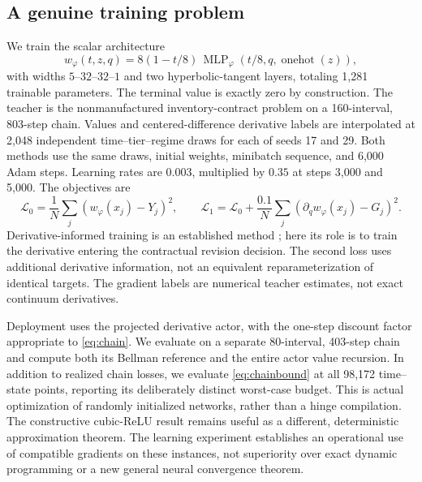\subsection{A genuine training problem}
We train the scalar architecture
\[
 w_\varphi(t,z,q)=8(1-t/8)\,
 \operatorname{MLP}_\varphi(t/8,q,\operatorname{onehot}(z)),
\]
with widths $5$--$32$--$32$--$1$ and two hyperbolic-tangent layers, totaling 1,281 trainable parameters. The terminal value is exactly zero by construction. The teacher is the nonmanufactured inventory-contract problem on a 160-interval, 803-step chain. Values and centered-difference derivative labels are interpolated at 2,048 independent time--tier--regime draws for each of seeds 17 and 29. Both methods use the same draws, initial weights, minibatch sequence, and 6,000 Adam steps. Learning rates are $0.003$, multiplied by $0.35$ at steps 3,000 and 5,000. The objectives are
\[
 \mathcal L_0=\frac1N\sum_j(w_\varphi(x_j)-Y_j)^2,
 \qquad
 \mathcal L_1=\mathcal L_0+
 \frac{0.1}{N}\sum_j(\partial_qw_\varphi(x_j)-G_j)^2.
\]
Derivative-informed training is an established method \citep{Czarnecki2017}; here its role is to train the derivative entering the contractual revision decision. The second loss uses additional derivative information, not an equivalent reparameterization of identical targets. The gradient labels are numerical teacher estimates, not exact continuum derivatives.

Deployment uses the projected derivative actor, with the one-step discount factor appropriate to \eqref{eq:chain}. We evaluate on a separate 80-interval, 403-step chain and compute both its Bellman reference and the entire actor value recursion. In addition to realized chain losses, we evaluate \eqref{eq:chainbound} at all 98,172 time--state points, reporting its deliberately distinct worst-case budget. This is actual optimization of randomly initialized networks, rather than a hinge compilation. The constructive cubic-ReLU result remains useful as a different, deterministic approximation theorem. The learning experiment establishes an operational use of compatible gradients on these instances, not superiority over exact dynamic programming or a new general neural convergence theorem.
